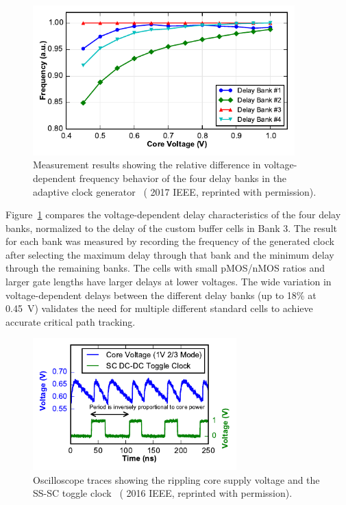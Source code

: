 \documentclass[graybox]{svmult}
\begin{document}
\begin{figure}
  \centering
  \includegraphics[width=0.9\textwidth]{6-raven4-clockgen-trc}
  \caption{Measurement results showing the relative difference in voltage-dependent frequency behavior of the four delay banks in the adaptive clock generator~\cite{Keller2017} ({\textcopyright} 2017 IEEE, reprinted with permission).}
  \label{fig:6-raven4-clockgen-trc}
\end{figure}

Figure~\ref{fig:6-raven4-clockgen-trc} compares the voltage-dependent delay characteristics of the four delay banks, normalized to the delay of the custom buffer cells in Bank 3.
The result for each bank was measured by recording the frequency of the generated clock after selecting the maximum delay through that bank and the minimum delay through the remaining banks.
The cells with small pMOS/nMOS ratios and larger gate lengths have larger delays at lower voltages.
The wide variation in voltage-dependent delays between the different delay banks (up to 18\% at \SI{0.45}{\volt}) validates the need for multiple different standard cells to achieve accurate critical path tracking.

\begin{figure}
  \centering
  \includegraphics[width=0.7\textwidth]{6-raven4-waveforms-powermeas}
  \caption{Oscilloscope traces showing the rippling core supply voltage and the SS-SC toggle clock~\cite{Keller2016} ({\textcopyright} 2016 IEEE, reprinted with permission).}
  \label{fig:6-raven4-waveforms-powermeas}
\end{figure}
\end{document}
